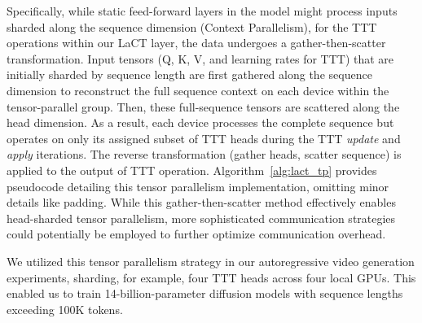 Specifically, while static feed-forward layers in the model might process inputs sharded along the sequence dimension (Context Parallelism), for the TTT operations within our LaCT layer, the data undergoes a gather-then-scatter transformation. Input tensors (Q, K, V, and learning rates for TTT) that are initially sharded by sequence length are first gathered along the sequence dimension to reconstruct the full sequence context on each device within the tensor-parallel group. Then, these full-sequence tensors are scattered along the head dimension. As a result, each device processes the complete sequence but operates on only its assigned subset of TTT heads during the TTT \textit{update} and \textit{apply} iterations. The reverse transformation (gather heads, scatter sequence) is applied to the output of TTT operation. Algorithm~\ref{alg:lact_tp} provides pseudocode detailing this tensor parallelism implementation, omitting minor details like padding. While this gather-then-scatter method effectively enables head-sharded tensor parallelism, more sophisticated communication strategies~\cite{fang2024usp, jacobs2023deepspeed} could potentially be employed to further optimize communication overhead. 

We utilized this tensor parallelism strategy in our autoregressive video generation experiments, sharding, for example, four TTT heads across four local GPUs. This enabled us to train 14-billion-parameter diffusion models with sequence lengths exceeding 100K tokens.

